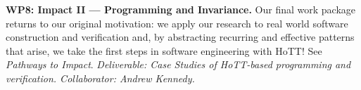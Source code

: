 \documentclass[a4paper,11pt]{article}
\begin{document}




{\bf WP8: Impact II --- Programming and Invariance.} %
Our final work package returns to our original motivation:
we apply our research to real world software construction and
verification and, by abstracting recurring and effective patterns that
arise, we take the first steps in software engineering with HoTT! See {\em Pathways to
  Impact}. {\em Deliverable: Case Studies of HoTT-based programming
  and verification. 
Collaborator: Andrew Kennedy.
}
\end{document}
